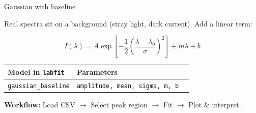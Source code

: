 \documentclass[handout, 10pt]{beamer}
\begin{document}
\begin{frame}{Gaussian with baseline}

Real spectra sit on a background (stray light, dark current). Add a linear term:

\[
I(\lambda) = A \exp\!\left[-\frac{1}{2}\left(\frac{\lambda - \lambda_0}{\sigma}\right)^{\!2}\right]
+ m\lambda + b
\]

\medskip
\begin{center}
\begin{tabular}{lll}
\toprule
Model in \texttt{labfit} & Parameters \\
\midrule
\texttt{gaussian\_baseline} & \texttt{amplitude, mean, sigma, m, b} \\
\bottomrule
\end{tabular}
\end{center}

\medskip
\textbf{Workflow:} Load CSV $\rightarrow$ Select peak region $\rightarrow$ Fit $\rightarrow$ Plot \& interpret.
\end{frame}
\end{document}
